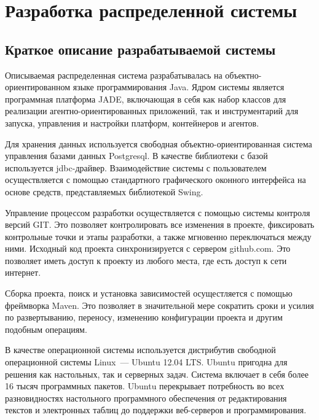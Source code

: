 \updateStamp
{}
\section{Разработка распределенной системы}
\subsection{Краткое описание разрабатываемой системы}
Описываемая распределенная система разрабатывалась на объектно-ориентированном языке программирования Java. Ядром системы является программная платформа JADE, включающая в себя как набор классов для реализации агентно-ориентированных приложений, так и инструментарий для запуска, управления и настройки платформ, контейнеров и агентов.

	Для хранения данных используется свободная объектно-ориентированная система управления базами данных Postgresql. В качестве библиотеки с базой используется jdbc-драйвер. Взаимодействие системы с пользователем осуществляется с помощью стандартного графического оконного интерфейса на основе средств, представляемых библиотекой Swing.

	Управление процессом разработки осуществляется с помощью системы контроля версий GIT. Это позволяет контролировать все изменения в проекте, фиксировать контрольные точки и этапы разработки, а также мгновенно переключаться между ними. Исходный код проекта синхронизируется с сервером github.com. Это позволяет иметь доступ к проекту из любого места, где есть доступ к сети интернет.

	Сборка проекта, поиск и установка зависимостей осущестляется с помощью фреймворка Maven. Это позволяет в значительной мере сократить сроки и усилия по развертыванию, переносу, изменению конфигурации проекта и другим подобным операциям.

В качестве операционной системы используется дистрибутив свободной операционной системы Linux~--- Ubuntu 12.04 LTS. Ubuntu пригодна для решения как настольных, так и серверных задач. Система включает в себя более 16 тысяч программных пакетов. Ubuntu перекрывает потребность во всех разновидностях настольного программного обеспечения от редактирования текстов и электронных таблиц до поддержки веб-серверов и программирования. 

